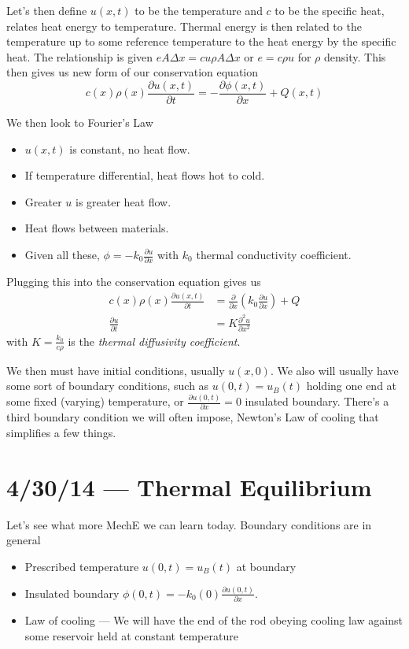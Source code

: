 \documentclass[10pt]{report}
\newcommand{\ptd}[2]{\frac{\partial^2 #1}{\partial#2^2}}
\newcommand{\pd}[2]{\frac{\partial #1}{\partial#2}}
\begin{document}
Let's then define $u(x,t)$ to be the temperature and $c$ to be the specific heat, relates heat energy to temperature. Thermal energy is then related to the temperature up to some reference temperature to the heat energy by the specific heat. The relationship is given $e A \Delta x = cu\rho A \Delta x$ or $e = c\rho u$ for $\rho$ density. This then gives us new form of our conservation equation
\begin{equation}
    c(x)\rho(x)\pd{u(x,t)}{t} = -\pd{\phi(x,t)}{x} + Q(x,t)
\end{equation}

We then look to Fourier's Law
\begin{itemize}
    \item $u(x,t)$ is constant, no heat flow.
    \item If temperature differential, heat flows hot to cold.
    \item Greater $u$ is greater heat flow.
    \item Heat flows between materials.
    \item Given all these, $\phi = -k_0 \pd{u}{x}$ with $k_0$ thermal conductivity coefficient. 
\end{itemize}

Plugging this into the conservation equation gives us
\begin{align}
    c(x) \rho(x) \pd{u(x,t)}{t} &= \pd{}{x}\left(k_0 \pd{u}{x}\right) + Q\\
    \pd{u}{t} &= K \ptd{u}{x}
\end{align}
with $K = \frac{k_0}{c\rho}$ is the \emph{thermal diffusivity coefficient}. 

We then must have initial conditions, usually $u(x,0)$. We also will usually have some sort of boundary conditions, such as $u(0,t) = u_B(t)$ holding one end at some fixed (varying) temperature, or $\pd{u(0,t)}{x} = 0$ insulated boundary. There's a third boundary condition we will often impose, Newton's Law of cooling that simplifies a few things.
\chapter{4/30/14 --- Thermal Equilibrium}

Let's see what more MechE we can learn today. Boundary conditions are in general
\begin{itemize}
    \item Prescribed temperature $u(0,t) = u_B(t)$ at boundary
    \item Insulated boundary $\phi(0,t) = -k_0(0) \pd{u(0,t)}{x}$.
    \item Law of cooling --- We will have the end of the rod obeying cooling law against some reservoir held at constant temperature
\end{itemize}
\end{document}
